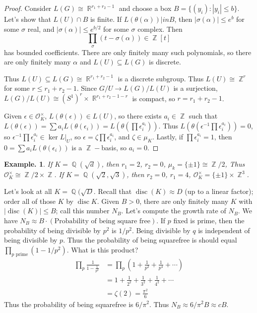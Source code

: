 \documentclass[11pt, a4paper]{memoir}
\DeclareMathOperator{\Q}{{\mathbb{Q}}}
\DeclareMathOperator{\Z}{{\mathbb{Z}}}
\DeclareMathOperator{\R}{{\mathbb{R}}}
\theoremstyle{change}
\theoremstyle{plain}
\theoremstyle{nonumberplain}
\newtheorem{example}{Example.}
\newtheorem{proof}{Proof}
\DeclareMathOperator{\disc}{disc}
\numberwithin{equation}{section}
\begin{document}
\begin{proof}
    Consider $L(G)\cong\R^{r_1+r_2-1}$ and choose a box $B=\{(y_i):|y_i|\leq b\}$.
    Let's show that $L(U)\cap B$ is finite.
    If $L(\theta(\alpha))|in B$, then $|\sigma(\alpha)|\leq e^b$ for some $\sigma$ real, and $|\sigma(\alpha)|\leq e^{b/2}$ for some $\sigma$ complex.
    Then
    \begin{equation*}
        \prod_\sigma(t-\sigma(\alpha))\in\Z[t]
    \end{equation*}
    has bounded coefficients.
    There are only finitely many such polynomials, so there are only finitely many $\alpha$ and $L(U)\subseteq L(G)$ is discrete.
    
    Thus $L(U)\subseteq L(G)\cong\R^{r_1+r_2-1}$ is a discrete subgroup.
    Thus $L(U)\cong\Z^r$ for some $r\leq r_1+r_2-1$.
    Since $G/U\to L(G)/L(U)$ is a surjection, $L(G)/L(U)\cong (S^1)^r\times\R^{r_1+r_2-1-r}$ is compact, so $r=r_1+r_2-1$.

    Given $\epsilon\in\mathcal{O}_K^\times$, $L(\theta(\epsilon))\in L(U)$, so there exists $a_i\in\Z$ such that $L(\theta(\epsilon))=\sum a_iL(\theta(\epsilon_i))=L(\theta(\prod\epsilon_i^{a_i}))$.
    Thus $L(\theta(\epsilon^{-1}\prod\epsilon_i^{a_i}))=0$, so $\epsilon^{-1}\prod\epsilon_i^{a_i}\in\ker L|_U$, so $\epsilon=\zeta\prod\epsilon_i^{a_i}$, and $\zeta\in\mu_K$.
    Lastly, if $\prod\epsilon_i^{a_i}=1$, then $0=\sum a_iL(\theta(\epsilon_i))$ is a $\Z-$basis, so $a_i=0$.
\end{proof}
\begin{example}
    If $K=\Q(\sqrt{d})$, then $r_1=2$, $r_2=0$, $\mu_k=\{\pm 1\}\cong\Z/2$, Thus $\mathcal{O}_K^\times\cong\Z/2\times\Z$.
    If $K=\Q(\sqrt{2},\sqrt{3})$, then $r_2=0$, $r_1=4$, $\mathcal{O}_K^\times=\{\pm 1\}\times\Z^3$.
\end{example}
Let's look at all $K=\Q(\sqrt{D}$.
Recall that $\disc(K)\approx D$ (up to a linear factor); order all of those $K$ by $\disc K$.
Given $B>0$, there are only finitely many $K$ with $|\disc(K)|\leq B$; call this number $N_B$.
Let's compute the growth rate of $N_B$.
We have $N_B\approx B\cdot(\text{Probability of being square free})$.
If $p$ fixed is prime, then the probability of being divisible by $p^2$ is $1/p^2$.
Being divisible by $q$ is independent of being divisible by $p$.
Thus the probability of being squarefree is should equal $\prod_{p\text{ prime}}(1-1/p^2)$.
What is this product?
\begin{align*}
    \prod_p\frac{1}{1-\frac{1}{p^2}} &= \prod_p\left(1+\frac{1}{p^2}+\frac{1}{p^4}+\cdots\right)\\
                                     &= 1+\frac{1}{2^2}+\frac{1}{3^2}+\frac{1}{4^2}+\cdots\\
                                     &= \zeta(2)=\frac{\pi^2}{6}
\end{align*}
Thus the probability of being squarefree is $6/\pi^2$.
Thus $N_B\approx 6/\pi^2 B\approx cB$.
\end{document}
